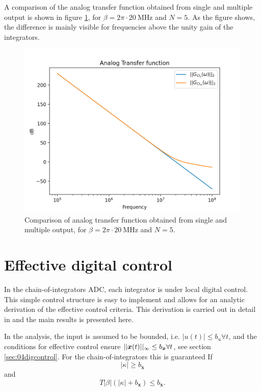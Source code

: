 A comparison of the analog transfer function obtained from single and multiple output is shown in figure \ref{fig:atf_ci_m_vs_s}, for $\beta = 2\pi \cdot \SI{20}{\mega\hertz}$ and $N=5$. As the figure shows, the difference is mainly visible for frequencies above the unity gain of the integrators.

\begin{figure}[htbp]
    \centering
    \includegraphics[width=\linewidth]{figures/051chain/ATF_m_vs_s.png}
    \caption{Comparison of analog transfer function obtained from single and multiple output, for $\beta = 2\pi \cdot \SI{20}{\mega\hertz}$ and $N=5$.}
    \label{fig:atf_ci_m_vs_s}
\end{figure}















\section{Effective digital control}
In the chain-of-integrators ADC, each integrator is under local digital control. This simple control structure is easy to implement and allows for an analytic derivation of the effective control criteria. This derivation is carried out in detail in \cite{malmberg_thesis} and the main results is presented here.

In the analysis, the input is assumed to be bounded, i.e. $|u(t)| \leq b_u \forall t$, and the conditions for effective control ensure $||\bm{x}(t)||_{\infty} \leq b_{\bm{x}} \forall t$, see section \ref{sec:04digcontrol}. For the chain-of-integrators this is guaranteed If
\begin{equation}
    \label{eq:effctrl_kappa}
    |\kappa| \geq b_{\bm{x}}
\end{equation}
and
\begin{equation}
    \label{eq:effctrl_Tbeta}
    T|\beta|(|\kappa| + b_{\bm{x}}) \leq b_{\bm{x}}.
\end{equation}

